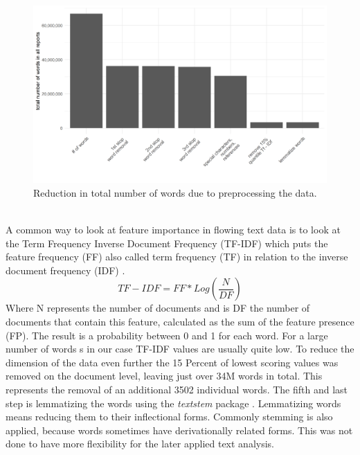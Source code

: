 \begin{figure}[h]
\centering
\includegraphics[width=\textwidth]{figures/ReductionInTotalNWords.png}
\caption{Reduction in total number of words due to preprocessing the data.}
\label{fig:TotWord}
\end{figure} \\ 

A common way to look at feature importance in flowing text data is to look at the Term Frequency Inverse Document Frequency (TF-IDF) which puts the feature frequency (FF) also called term frequency (TF) in relation to the inverse document frequency (IDF) \citep{na2004effectiveness}. 
\begin{equation}
    TF-IDF = FF * Log(\frac{N}{DF})
\end{equation} 
Where N represents the number of documents and is DF the number of documents that contain this feature, calculated as the sum of the feature presence (FP). The result is a probability between 0 and 1 for each word. For a large number of words s in our case TF-IDF values are usually quite low. To reduce the dimension of the data even further the 15 Percent of lowest scoring values was removed on the document level, leaving just over 34M words in total. This represents the removal of an additional 3502 individual words. The fifth and last step is lemmatizing the words using the \textit{textstem} package \citep{textstem}. Lemmatizing words means reducing them to their inflectional forms. Commonly stemming is also applied, because words sometimes have derivationally related forms. This was not done to have more flexibility for the later applied text analysis. \\ \\


